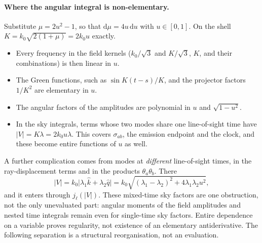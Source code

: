 \documentclass[11pt]{article}
\theoremstyle{definition}
\theoremstyle{remark}
\newcommand{\dd}{\mathrm{d}}
\begin{document}
\paragraph{Where the angular integral is non-elementary.} Substitute $\mu=2u^2-1$, so that
$\dd\mu=4u\,\dd u$ with $u\in[0,1]$. On the shell $K=k_0\sqrt{2(1+\mu)}=2k_0u$ exactly.
\begin{itemize}
\item Every frequency in the field kernels ($k_0/\sqrt3$ and $K/\sqrt3$, $K$, and their
  combinations) is then linear in $u$.
\item The Green functions, such as $\sin K(t-s)/K$, and the projector factors $1/K^2$ are
  elementary in $u$.
\item The angular factors of the amplitudes are polynomial in $u$ and $\sqrt{1-u^2}$.
\item In the sky integrals, terms whose two modes share one line-of-sight time have
  $|V|=K\lambda=2k_0u\lambda$. This covers $\sigma_{ab}$, the emission endpoint and the clock,
  and these become entire functions of $u$ as well.
\end{itemize}
A further complication comes from modes at
\emph{different} line-of-sight times, in the ray-displacement terms and in the products
$\theta_a\theta_b$. There
\[
|V|=k_0\big|\lambda_1\hat k+\lambda_2\hat q\big|=k_0\sqrt{(\lambda_1-\lambda_2)^2+4\lambda_1\lambda_2u^2},
\]
and it enters through $j_\ell(|V|)$. These mixed-time sky factors are one obstruction,
not the only unevaluated part: angular moments of the field amplitudes and nested time
integrals remain even for single-time sky factors. Entire dependence on a variable proves
regularity, not existence of an elementary antiderivative. The following separation is a
structural reorganisation, not an evaluation.
\end{document}
